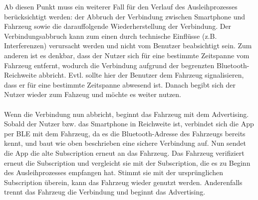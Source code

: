 Ab diesen Punkt muss ein weiterer Fall für den Verlauf des Ausleihprozesses berücksichtigt werden: der Abbruch der Verbindung zwischen Smartphone und Fahrzeug sowie die darauffolgende Wiederherstellung der Verbindung. Der Verbindungsabbruch kann zum einen durch technische Einflüsse (z.B. Interferenzen) verursacht werden und nicht vom Benutzer beabsichtigt sein. Zum anderen ist es denkbar, dass der Nutzer sich für eine bestimmte Zeitspanne vom Fahrzeug entfernt, wodurch die Verbindung aufgrund der begrenzten Bluetooth-Reichweite abbricht. Evtl. sollte hier der Benutzer dem Fahrzeug signalisieren, dass er für eine bestimmte Zeitspanne abwesend ist. Danach begibt sich der Nutzer wieder zum Fahzeug und möchte es weiter nutzen.
\\\\
Wenn die Verbindung nun abbricht, beginnt das Fahrzeug mit dem Advertising. Sobald der Nutzer bzw. das Smartphone in Reichweite ist, verbindet sich die App per BLE mit dem Fahrzeug, da es die Bluetooth-Adresse des Fahrzeugs bereits kennt, und baut wie oben beschrieben eine sichere Verbindung auf. Nun sendet die App die alte Subscription erneut an das Fahrzeug. Das Fahrzeug verifiziert erneut die Subscription und vergleicht sie mit der Subscription, die es zu Beginn des Ausleihprozesses empfangen hat. Stimmt sie mit der ursprünglichen Subscription überein, kann das Fahrzeug wieder genutzt werden. Anderenfalls trennt das Fahrzeug die Verbindung und beginnt das Advertising.
